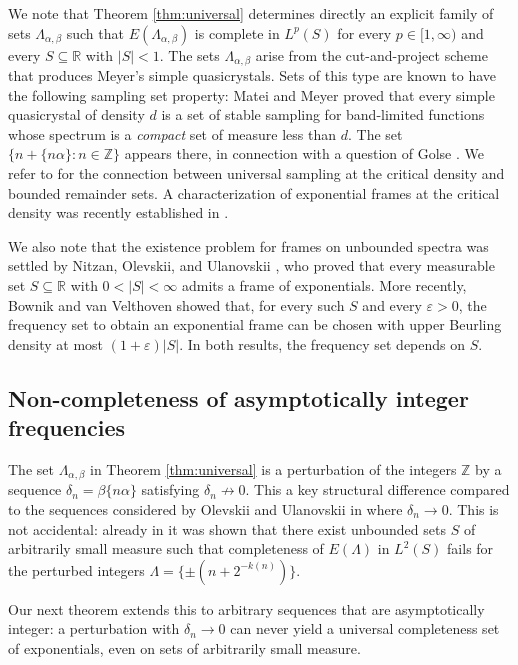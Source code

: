 \documentclass[reqno,a4paper,12pt]{amsart}
\numberwithin{equation}{section}
\def\Z{{\mathbb Z}}
\def\R{{\mathbb R}}
\newcommand\1{\mathds{1}}
\begin{document}
We note that Theorem \ref{thm:universal} determines directly an explicit family of sets $\Lambda_{\alpha,\beta}$ such that $E(\Lambda_{\alpha,\beta})$ is complete in $L^p(S)$ for every $p \in [1,\infty)$ and every $S \subseteq \R$ with $|S| < 1$. The sets $\Lambda_{\alpha,\beta}$ arise from the cut-and-project scheme that produces Meyer's simple quasicrystals. Sets of this type are known to have the following sampling set property: Matei and Meyer \cite{MateiMeyer2008,MateiMeyer2010} proved that every simple quasicrystal of density $d$ is a set of stable sampling for band-limited functions whose spectrum is a \emph{compact} set of measure less than $d$. The set $\{ n + \{n\alpha\} : n \in \Z\}$ appears there, in connection with a question of Golse \cite{MateiMeyer2010}. We refer to \cite{GrepstadLev2014,GrepstadLev2018} for the connection between universal sampling at the critical density and bounded remainder sets. A characterization of exponential frames at the critical density was recently established in \cite{enstad2025exponential}.

We also note that the existence problem for frames on unbounded spectra was settled by Nitzan, Olevskii, and Ulanovskii \cite{NitzanOlevskiiUlanovskii2016}, who proved that every measurable set $S\subseteq\R$ with $0<|S|<\infty$ admits a frame of exponentials. More recently, Bownik and van Velthoven \cite{BownikVanVelthoven2025Redundancy} showed that, for every such $S$ and every $\varepsilon>0$, the frequency set to obtain an exponential frame can be chosen with upper Beurling density at most $(1+\varepsilon)|S|$. In both results, the frequency set depends on $S$.


\subsection{Non-completeness of asymptotically integer frequencies}
The set $\Lambda_{\alpha,\beta}$ in Theorem \ref{thm:universal} is a perturbation of the integers $\Z$ by a sequence $\delta_n=\beta \{n\alpha\}$ satisfying $\delta_n\not \to 0$. This a key structural difference compared to the sequences considered by Olevskii and Ulanovskii in \cite{OlevskiiUlanovskii2008} where $\delta_n \to 0$. This is not accidental: already in \cite[Example 3.2]{OlevskiiUlanovskii2008} it was shown that there exist unbounded sets $S$ of arbitrarily small measure such that completeness of $E(\Lambda)$ in $L^2(S)$ fails for the perturbed integers $\Lambda = \{\pm(n+2^{-k(n)})\}$.

Our next theorem extends this to arbitrary sequences that are asymptotically integer: a perturbation with $\delta_n\to 0$ can never yield a universal completeness set of exponentials, even on sets of arbitrarily small measure.
\end{document}

